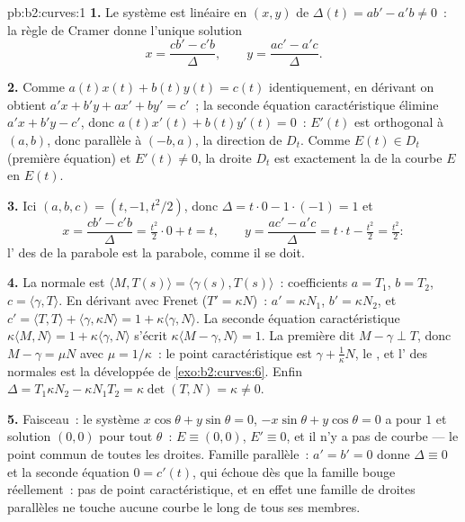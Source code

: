 \begin{solution}{pb:b2:curves:1}
\textbf{1.} Le système est linéaire en $(x, y)$ de 
$\Delta(t) = a b' - a'b \neq 0$~: la règle de Cramer donne
l'unique solution
\[
x = \frac{c b' - c' b}{\Delta}, \qquad
y = \frac{a c' - a' c}{\Delta}.
\]

\textbf{2.} Comme $a(t)x(t) + b(t)y(t) = c(t)$ identiquement,
en dérivant on obtient $a'x + b'y + ax' + by' = c'$~; la
seconde équation caractéristique élimine $a'x + b'y - c'$, donc
$a(t)x'(t) + b(t)y'(t) = 0$~: $E'(t)$ est orthogonal à $(a,
b)$, donc parallèle à $(-b, a)$, la direction de $D_t$. Comme
$E(t) \in D_t$ (première équation) et $E'(t) \neq 0$, la droite
$D_t$ est exactement la  de la courbe $E$ en $E(t)$.

\textbf{3.} Ici $(a, b, c) = (t, -1, t^2/2)$, donc $\Delta =
t\cdot0 - 1\cdot(-1) = 1$ et
\[
x = \frac{c b' - c' b}{\Delta} = \tfrac{t^2}2\cdot 0 +
t = t, \qquad
y = \frac{a c' - a' c}{\Delta} = t\cdot t - \tfrac{t^2}2 =
\tfrac{t^2}2 :
\]
l' des  de la parabole est la
parabole, comme il se doit.

\textbf{4.} La normale est $\langle M, T(s)\rangle =
\langle\gamma(s), T(s)\rangle$~: coefficients $a = T_1$, $b =
T_2$, $c = \langle\gamma, T\rangle$. En dérivant avec
Frenet ($T' = \kappa N$)~: $a' = \kappa N_1$, $b' = \kappa
N_2$, et $c' = \langle T, T\rangle + \langle\gamma, \kappa
N\rangle = 1 + \kappa\langle\gamma, N\rangle$. La seconde
équation caractéristique $\kappa\langle M, N\rangle = 1 +
\kappa\langle\gamma, N\rangle$ s'écrit $\kappa\langle M -
\gamma, N\rangle = 1$. La première dit $M - \gamma \perp T$,
donc $M - \gamma = \mu N$ avec $\mu = 1/\kappa$~: le
point caractéristique est $\gamma + \frac1\kappa N$, le , et l' des normales est la développée
de \cref{exo:b2:curves:6}. Enfin $\Delta = T_1\kappa N_2 -
\kappa N_1 T_2 = \kappa\det(T, N) = \kappa \neq 0$.

\textbf{5.} Faisceau~: le système $x\cos\theta + y\sin\theta =
0$, $-x\sin\theta + y\cos\theta = 0$ a pour  $1$ et
solution $(0,0)$ pour tout $\theta$~: $E \equiv (0,0)$, $E'
\equiv 0$, et il n'y a pas de courbe ---  le point
commun de toutes les droites. Famille parallèle~: $a' = b' = 0$
donne
$\Delta \equiv 0$ et la seconde équation $0 = c'(t)$, qui
échoue dès que la famille bouge réellement~: pas de point
caractéristique, et en effet une famille de droites parallèles ne
touche aucune courbe le long de tous ses membres.


\end{solution}
